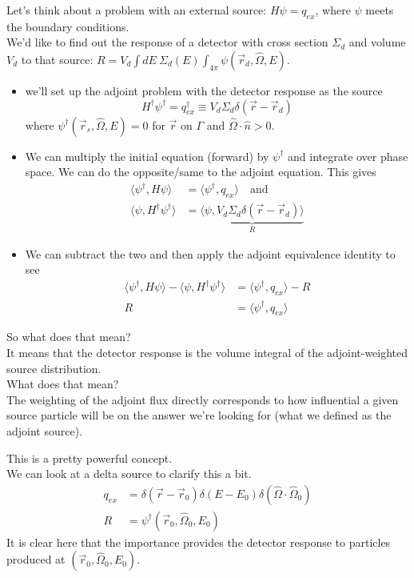 \documentclass[12pt]{article}
\newcommand{\rvec}{\ensuremath{\vec{r}}}
\newcommand{\vOmega}{\ensuremath{\hat{\Omega}}}
\begin{document}
Let's think about a problem with an external source: $H \psi = q_{ex}$, where $\psi$ meets the boundary conditions.\\
We'd like to find out the response of a detector with cross section $\Sigma_d$ and volume $V_d$ to that source: $R = V_d \int dE\: \Sigma_d(E) \int_{4\pi} \psi(\rvec_d, \vOmega, E)$. \\
\begin{itemize}
\item we'll set up the adjoint problem with the detector response as the source
\[H^{\dagger}\psi^{\dagger} = q_{ex}^{\dagger} \equiv V_d \Sigma_d \delta(\rvec - \rvec_d)\]
where $\psi^{\dagger}(\vec{r}_s, \vOmega, E) = 0$ for $\rvec$ on $\Gamma$ and $\vOmega \cdot \hat{n} > 0$.
%
\item We can multiply the initial equation (forward) by $\psi^{\dagger}$ and integrate over phase space. We can do the opposite/same to the adjoint equation. This gives
\begin{align*}
\langle\psi^{\dagger}, H\psi\rangle &= \langle\psi^{\dagger}, q_{ex}\rangle \quad \text{and}\\
\langle\psi, H^{\dagger} \psi^{\dagger}\rangle &= \underbrace{\langle\psi, V_d \Sigma_d \delta(\rvec - \rvec_d)\rangle }_R
\end{align*}
%
\item We can subtract the two and then apply the adjoint equivalence identity to see
\begin{align*}
\langle\psi^{\dagger}, H\psi\rangle - \langle\psi, H^{\dagger} \psi^{\dagger}\rangle &= \langle\psi^{\dagger}, q_{ex}\rangle - R \\
R &= \langle\psi^{\dagger}, q_{ex}\rangle
\end{align*}
\end{itemize}
%
So what does that mean? \\
It means that the detector response is the volume integral of the adjoint-weighted source distribution. \\
What does that mean? \\
The weighting of the adjoint flux directly corresponds to how influential a given source particle will be on the answer we're looking for (what we defined as the adjoint source).

This is a pretty powerful concept. \\
We can look at a delta source to clarify this a bit.
\begin{align*}
q_{ex} &= \delta(\rvec - \rvec_0) \delta(E - E_0) \delta(\vOmega \cdot \vOmega_0) \\
R &= \psi^{\dagger}(\rvec_0, \vOmega_0, E_0)
\end{align*}
It is clear here that the importance provides the detector response to particles produced at $(\rvec_0, \vOmega_0, E_0)$.
\end{document}
